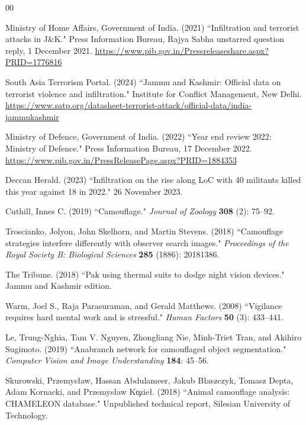 \documentclass[3p,times,procedia]{elsarticle}
\begin{document}

\begin{thebibliography}{00}

{M}inistry of Home Affairs, Government of India. (2021) ``Infiltration and terrorist attacks in J\&K." Press Information Bureau, Rajya Sabha unstarred question reply, 1 December 2021. \url{https://www.pib.gov.in/Pressreleaseshare.aspx?PRID=1776816}

{S}outh Asia Terrorism Portal. (2024) ``Jammu and Kashmir: Official data on terrorist violence and infiltration." Institute for Conflict Management, New Delhi. \url{https://www.satp.org/datasheet-terrorist-attack/official-data/india-jammukashmir}

{M}inistry of Defence, Government of India. (2022) ``Year end review 2022: Ministry of Defence." Press Information Bureau, 17 December 2022. \url{https://www.pib.gov.in/PressReleasePage.aspx?PRID=1884353}

{D}eccan Herald. (2023) ``Infiltration on the rise along LoC with 40 militants killed this year against 18 in 2022." 26 November 2023.

{C}uthill, Innes C. (2019) ``Camouflage." {\it Journal of Zoology} {\bf 308} (2): 75--92.

{T}roscianko, Jolyon, John Skelhorn, and Martin Stevens. (2018) ``Camouflage strategies interfere differently with observer search images." {\it Proceedings of the Royal Society B: Biological Sciences} {\bf 285} (1886): 20181386.

{T}he Tribune. (2018) ``Pak using thermal suits to dodge night vision devices." Jammu and Kashmir edition.

{W}arm, Joel S., Raja Parasuraman, and Gerald Matthews. (2008) ``Vigilance requires hard mental work and is stressful." {\it Human Factors} {\bf 50} (3): 433--441.

{L}e, Trung-Nghia, Tam V. Nguyen, Zhongliang Nie, Minh-Triet Tran, and Akihiro Sugimoto. (2019) ``Anabranch network for camouflaged object segmentation." {\it Computer Vision and Image Understanding} {\bf 184}: 45--56.

{S}kurowski, Przemys{\l}aw, Hassan Abdulameer, Jakub B{\l}aszczyk, Tomasz Depta, Adam Kornacki, and Przemys{\l}aw K{\c{o}}zie{\l}. (2018) ``Animal camouflage analysis: CHAMELEON database." Unpublished technical report, Silesian University of Technology.


\end{thebibliography}
\end{document}
